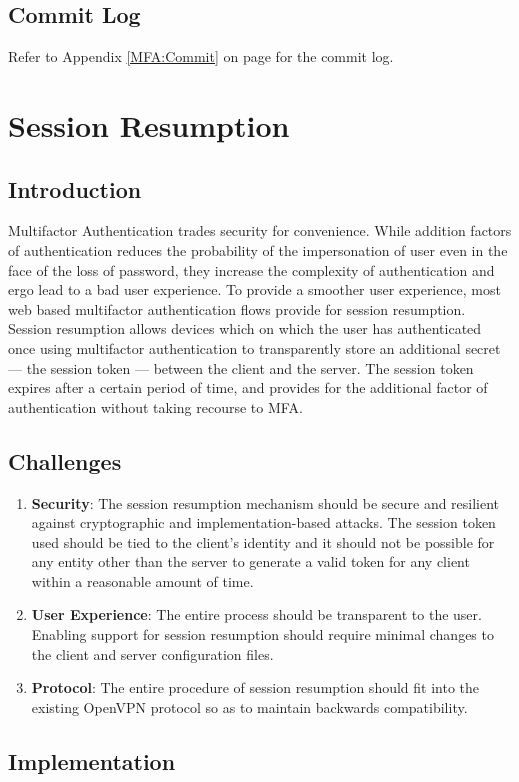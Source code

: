 \documentclass[11pt,oneside]{book}
\newcommand{\mychapter}[2]{
    \setcounter{chapter}{#1}
    \setcounter{section}{0}
    \chapter*{#2}
    \addcontentsline{toc}{chapter}{#2}
}
\begin{document}
\section{Commit Log}
Refer to Appendix \ref{MFA:Commit} on page \pageref{MFA:Commit} for the commit log.

\mychapter{3}{Session Resumption}
\section{Introduction}
Multifactor Authentication trades security for convenience. While addition factors of authentication
reduces the probability of the impersonation of user even in the face of the loss of password,
they increase the complexity of authentication and ergo lead to a bad user experience.
To provide a smoother user experience, most web based multifactor authentication
flows provide for session resumption. Session resumption allows devices which on which the user has authenticated
once using multifactor authentication to transparently store an additional secret --- the session
token --- between the client and the server. The session token expires after a certain period of
time, and provides for the additional factor of authentication without taking recourse to MFA.

\section{Challenges}
\begin{enumerate}
    \item \textbf{Security}: The session resumption mechanism should be secure and resilient against cryptographic and implementation-based attacks. The session token used should be tied to the client's identity and it should not be possible for any entity other than the server to generate a valid token for any client within a reasonable amount of time.
    \item \textbf{User Experience}: The entire process should be transparent to the user. Enabling support for session resumption should require minimal changes to the client and server configuration files.
    \item \textbf{Protocol}: The entire procedure of session resumption should fit into the existing OpenVPN protocol so as to maintain backwards compatibility.
\end{enumerate}

\section{Implementation}
\end{document}
